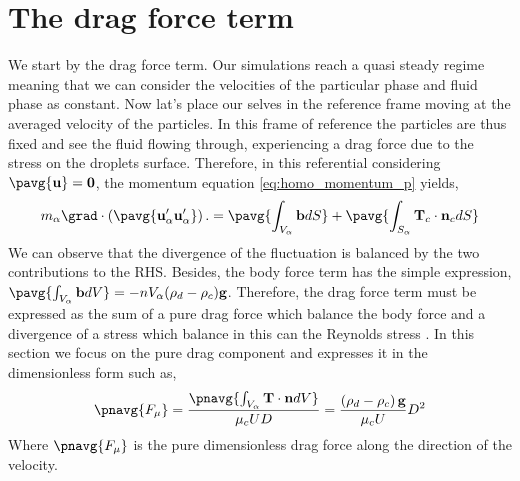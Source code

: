 \section{The drag force term}
We start by the drag force term. 
Our simulations reach a quasi steady regime meaning that we can consider the velocities of the particular phase and fluid phase as constant.
Now lat's place our selves in the reference frame moving at the averaged velocity of the particles. 
In this frame of reference the particles are thus fixed and see the fluid flowing through, experiencing a drag force due to the stress on the droplets surface. 
Therefore, in this referential considering $\pavg{\textbf{u}} = \textbf{0}$, the momentum equation \ref{eq:homo_momentum_p} yields, 
\begin{equation*}
    m_\alpha \grad \cdot \left(\pavg{\textbf{u}_\alpha' \textbf{u}_\alpha'}\right). 
    = \pavg{\int_{V_\alpha} \textbf{b} dS}
    + \pavg{\int_{S_\alpha} \textbf{T}_c  \cdot \textbf{n}_c dS}
\end{equation*}
We can observe that the divergence of the fluctuation is balanced by the two contributions to the RHS.  
Besides, the body force term has the simple expression, $\pavg{\int_{V_\alpha} \textbf{b} dV} = - nV_\alpha (\rho_d-\rho_c) \textbf{g}$. 
Therefore, the drag force term must be expressed as the sum of a pure drag force which balance the body force and a divergence of a stress which balance in this can the Reynolds stress \citep{zhang2021ensemble,wang2021numerical,nott2011suspension}. 
In this section we focus on the pure drag component and expresses it in the dimensionless form such as, 
\begin{align*}
    \pnavg{F_\mu}
    = \frac
    {\pnavg{\int_{V_\alpha} \textbf{T}\cdot \textbf{n}dV}}
    {\mu_c U D}
    = \frac
    {\left(\rho_d -\rho_c\right) \textbf{g}}
    {\mu_c U}D^2
\end{align*}
Where $\pnavg{F_\mu}$ is the pure dimensionless drag force along the direction of the velocity. 

